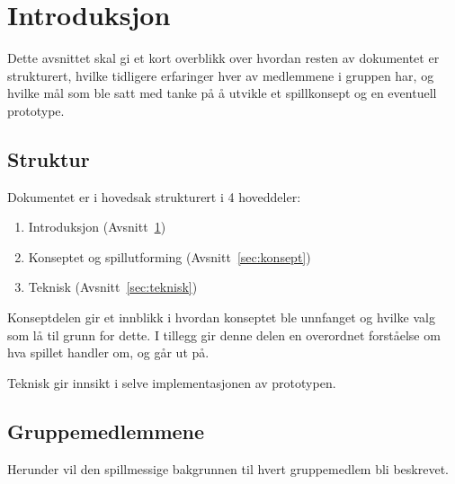 \section{Introduksjon}\label{sec:intro}
Dette avsnittet skal gi et kort overblikk over hvordan resten av
dokumentet er strukturert, hvilke tidligere erfaringer hver av
medlemmene i gruppen har, og hvilke mål som ble satt med tanke på å
utvikle et spillkonsept og en eventuell prototype.

\subsection{Struktur}
Dokumentet er i hovedsak strukturert i 4 hoveddeler:
\begin{enumerate}
	\item Introduksjon (Avsnitt~\ref{sec:intro})
	\item Konseptet og spillutforming (Avsnitt~\ref{sec:konsept})
	\item Teknisk (Avsnitt~\ref{sec:teknisk})
\end{enumerate}
Konseptdelen gir et innblikk i hvordan konseptet ble unnfanget og hvilke
valg som lå til grunn for dette. I tillegg gir denne delen en overordnet
forståelse om hva spillet handler om, og går ut på.

Teknisk gir innsikt i selve implementasjonen av prototypen.

\subsection{Gruppemedlemmene}
Herunder vil den spillmessige bakgrunnen til hvert gruppemedlem bli
beskrevet.

